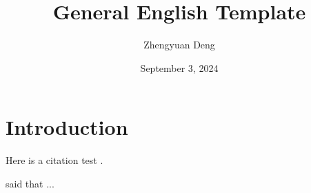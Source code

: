 \documentclass[
               a4paper,
               12pt
               ]{article}
\title{General English Template}
\author{Zhengyuan Deng}
\date{September 3, 2024} %
\begin{document}
\maketitle

\section{Introduction}

Here is a citation test \autocite{zhu1995cocurrent}.

\textcite{zhu1995cocurrent} said that ...








% 
% 
% 
% 
% 
\newpage
\begin{spacing}{1.1}
    \printbibliography 
\end{spacing}
\end{document}
